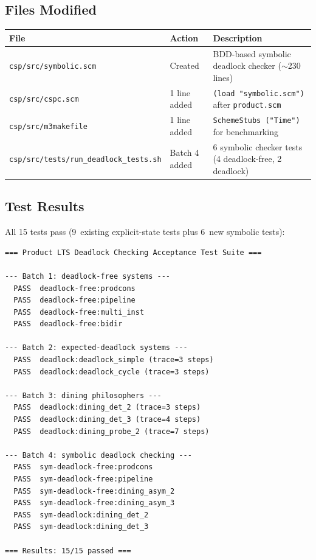 \documentclass[11pt]{article}
\begin{document}
\subsection{Files Modified}

\begin{center}
\begin{tabular}{llp{7.5cm}}
\toprule
\textbf{File} & \textbf{Action} & \textbf{Description} \\
\midrule
\texttt{csp/src/symbolic.scm} & Created & BDD-based symbolic deadlock checker ($\sim$230 lines) \\
\texttt{csp/src/cspc.scm} & 1 line added & \texttt{(load "symbolic.scm")} after \texttt{product.scm} \\
\texttt{csp/src/m3makefile} & 1 line added & \texttt{SchemeStubs ("Time")} for benchmarking \\
\texttt{csp/src/tests/run\_deadlock\_tests.sh} & Batch 4 added & 6 symbolic checker tests (4 deadlock-free, 2 deadlock) \\
\bottomrule
\end{tabular}
\end{center}

\subsection{Test Results}

All 15 tests pass (9~existing explicit-state tests plus
6~new symbolic tests):

\begin{Verbatim}[fontsize=\small]
=== Product LTS Deadlock Checking Acceptance Test Suite ===

--- Batch 1: deadlock-free systems ---
  PASS  deadlock-free:prodcons
  PASS  deadlock-free:pipeline
  PASS  deadlock-free:multi_inst
  PASS  deadlock-free:bidir

--- Batch 2: expected-deadlock systems ---
  PASS  deadlock:deadlock_simple (trace=3 steps)
  PASS  deadlock:deadlock_cycle (trace=3 steps)

--- Batch 3: dining philosophers ---
  PASS  deadlock:dining_det_2 (trace=3 steps)
  PASS  deadlock:dining_det_3 (trace=4 steps)
  PASS  deadlock:dining_probe_2 (trace=7 steps)

--- Batch 4: symbolic deadlock checking ---
  PASS  sym-deadlock-free:prodcons
  PASS  sym-deadlock-free:pipeline
  PASS  sym-deadlock-free:dining_asym_2
  PASS  sym-deadlock-free:dining_asym_3
  PASS  sym-deadlock:dining_det_2
  PASS  sym-deadlock:dining_det_3

=== Results: 15/15 passed ===
\end{Verbatim}
\end{document}
